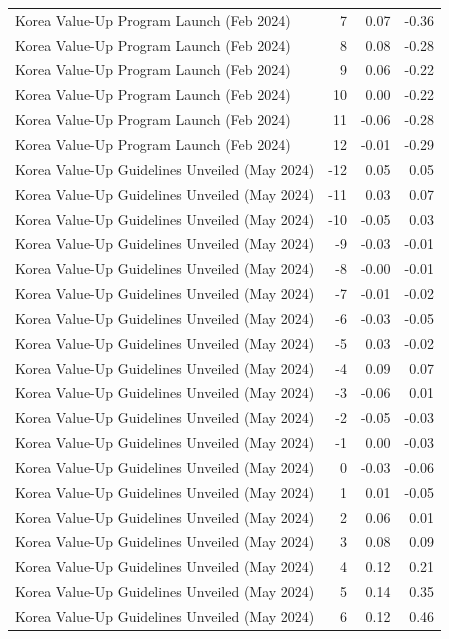 \begin{table}
\begin{tabular}{lrrr}
Korea Value-Up Program Launch (Feb 2024) & 7 & 0.07 & -0.36 \\
Korea Value-Up Program Launch (Feb 2024) & 8 & 0.08 & -0.28 \\
Korea Value-Up Program Launch (Feb 2024) & 9 & 0.06 & -0.22 \\
Korea Value-Up Program Launch (Feb 2024) & 10 & 0.00 & -0.22 \\
Korea Value-Up Program Launch (Feb 2024) & 11 & -0.06 & -0.28 \\
Korea Value-Up Program Launch (Feb 2024) & 12 & -0.01 & -0.29 \\
Korea Value-Up Guidelines Unveiled (May 2024) & -12 & 0.05 & 0.05 \\
Korea Value-Up Guidelines Unveiled (May 2024) & -11 & 0.03 & 0.07 \\
Korea Value-Up Guidelines Unveiled (May 2024) & -10 & -0.05 & 0.03 \\
Korea Value-Up Guidelines Unveiled (May 2024) & -9 & -0.03 & -0.01 \\
Korea Value-Up Guidelines Unveiled (May 2024) & -8 & -0.00 & -0.01 \\
Korea Value-Up Guidelines Unveiled (May 2024) & -7 & -0.01 & -0.02 \\
Korea Value-Up Guidelines Unveiled (May 2024) & -6 & -0.03 & -0.05 \\
Korea Value-Up Guidelines Unveiled (May 2024) & -5 & 0.03 & -0.02 \\
Korea Value-Up Guidelines Unveiled (May 2024) & -4 & 0.09 & 0.07 \\
Korea Value-Up Guidelines Unveiled (May 2024) & -3 & -0.06 & 0.01 \\
Korea Value-Up Guidelines Unveiled (May 2024) & -2 & -0.05 & -0.03 \\
Korea Value-Up Guidelines Unveiled (May 2024) & -1 & 0.00 & -0.03 \\
Korea Value-Up Guidelines Unveiled (May 2024) & 0 & -0.03 & -0.06 \\
Korea Value-Up Guidelines Unveiled (May 2024) & 1 & 0.01 & -0.05 \\
Korea Value-Up Guidelines Unveiled (May 2024) & 2 & 0.06 & 0.01 \\
Korea Value-Up Guidelines Unveiled (May 2024) & 3 & 0.08 & 0.09 \\
Korea Value-Up Guidelines Unveiled (May 2024) & 4 & 0.12 & 0.21 \\
Korea Value-Up Guidelines Unveiled (May 2024) & 5 & 0.14 & 0.35 \\
Korea Value-Up Guidelines Unveiled (May 2024) & 6 & 0.12 & 0.46 \\

\end{tabular}
\end{table}
